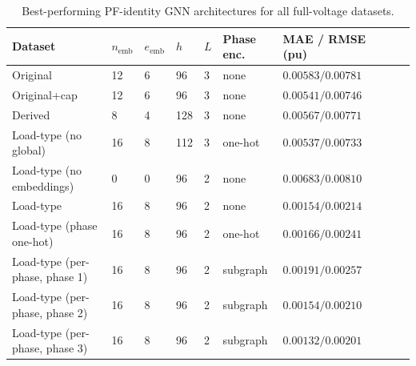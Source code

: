 \documentclass[11pt]{article}
\begin{document}
\begin{table}[htbp]
  \centering
  \footnotesize
  \caption{Best-performing PF-identity GNN architectures for all full-voltage datasets.}
  \label{tab:best-gnn-arch}
  \begin{tabular}{llllllllll}
    \toprule
    Dataset & $n_{\text{emb}}$ & $e_{\text{emb}}$ & $h$ & $L$ & Phase enc. & MAE / RMSE (pu) \\
    \midrule
    Original 
        & 12 & 6 & 96 & 3 & none  
        & $0.00583 / 0.00781$ \\
    Original+cap 
        & 12 & 6 & 96 & 3 & none
        & $0.00541 / 0.00746$ \\
    Derived  
        & 8 & 4 & 128 & 3 & none 
        & $0.00567 / 0.00771$ \\
    Load-type (no global) 
        & 16 & 8 & 112 & 3 & one-hot 
        & $0.00537 / 0.00733$ \\
    Load-type (no embeddings) 
        & 0 & 0 & 96 & 2 & none
        & $0.00683 / 0.00810$ \\
    Load-type 
        & 16 & 8 & 96 & 2 & none
        & $0.00154 / 0.00214$ \\
    Load-type (phase one-hot) 
        & 16 & 8 & 96 & 2 & one-hot
        & $0.00166 / 0.00241$ \\
    Load-type (per-phase, phase 1) 
        & 16 & 8 & 96 & 2 & subgraph
        & $0.00191 / 0.00257$ \\
    Load-type (per-phase, phase 2) 
        & 16 & 8 & 96 & 2 & subgraph
        & $0.00154 / 0.00210$ \\
    Load-type (per-phase, phase 3) 
        & 16 & 8 & 96 & 2 & subgraph
        & $0.00132 / 0.00201$ \\
    \bottomrule
  \end{tabular}
\end{table}
\end{document}
